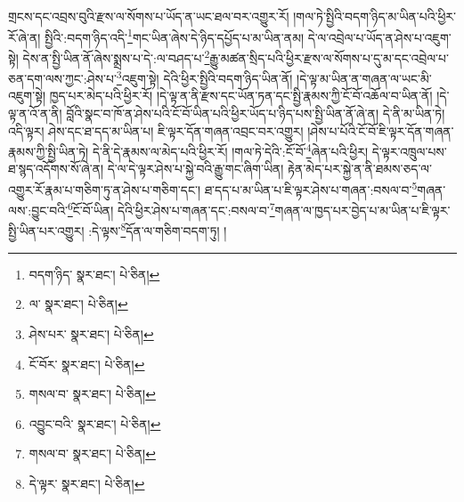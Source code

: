 གྲངས་དང་འབྲས་བུའི་རྫས་ལ་སོགས་པ་ཡོད་ན་ཡང་ཐལ་བར་འགྱུར་རོ། །གལ་ཏེ་སྤྱིའི་བདག་ཉིད་མ་ཡིན་པའི་ཕྱིར་རོ་ཞེ་ན། སྤྱིའི་:བདག་ཉིད་འདི་\footnote{བདག་ཉིད་  སྣར་ཐང་།  པེ་ཅིན། }གང་ཡིན་ཞེས་དེ་ཉིད་དཔྱོད་པ་མ་ཡིན་ནམ། དེ་ལ་འབྲེལ་པ་ཡོད་ན་ཤེས་པ་འཇུག་སྟེ། དེས་ན་སྤྱི་ཡིན་ནོ་ཞེས་སྨྲས་པ་དེ་:ལ་བཤད་པ་\footnote{ལ་  སྣར་ཐང་།  པེ་ཅིན། }རྒྱུ་མཚན་སྲིད་པའི་ཕྱིར་རྫས་ལ་སོགས་པ་དུ་མ་དང་འབྲེལ་པ་ཅན་དག་ལས་ཀྱང་:ཤེས་པ་\footnote{ཤེས་པར་  སྣར་ཐང་།  པེ་ཅིན། }འཇུག་སྟེ། དེའི་ཕྱིར་སྤྱིའི་བདག་ཉིད་ཡིན་ནོ། །དེ་ལྟ་མ་ཡིན་ན་གཞན་ལ་ཡང་མི་འཇུག་སྟེ། ཁྱད་པར་མེད་པའི་ཕྱིར་རོ། །དེ་ལྟ་ན་ནི་རྫས་དང་ཡོན་ཏན་དང་སྤྱི་རྣམས་ཀྱི་ངོ་བོ་འཆོལ་བ་ཡིན་ནོ། །དེ་ལྟ་ན་འོ་ན་ནི། བློའི་སྣང་བ་ཁོ་ན་ཤེས་པའི་ངོ་བོ་ཡིན་པའི་ཕྱིར་ཡོད་པ་ཉིད་པས་སྤྱི་ཡིན་ནོ་ཞེ་ན། དེ་ནི་མ་ཡིན་ཏེ། འདི་ལྟར། ཤེས་དང་ཐ་དད་མ་ཡིན་པ། ཇི་ལྟར་དོན་གཞན་འབྲང་བར་འགྱུར། །ཤེས་པ་པོའི་ངོ་བོ་ཇི་ལྟར་དོན་གཞན་རྣམས་ཀྱི་སྤྱི་ཡིན་ཏེ། དེ་ནི་དེ་རྣམས་ལ་མེད་པའི་ཕྱིར་རོ། །གལ་ཏེ་དེའི་:ངོ་བོ་\footnote{ངོ་བོར་  སྣར་ཐང་།  པེ་ཅིན། }ཞེན་པའི་ཕྱིར། དེ་ལྟར་འཁྲུལ་པས་ཐ་སྙད་འདོགས་སོ་ཞེ་ན། དེ་ལ་དེ་ལྟར་ཤེས་པ་སྐྱེ་བའི་རྒྱུ་གང་ཞིག་ཡིན། རྟེན་མེད་པར་སྐྱེ་ན་ནི་ཐམས་ཅད་ལ་འགྱུར་རོ་རྣམ་པ་གཅིག་ཏུ་ན་ཤེས་པ་གཅིག་དང་། ཐ་དད་པ་མ་ཡིན་པ་ཇི་ལྟར་ཤེས་པ་གཞན་:བསལ་བ་\footnote{གསལ་བ་  སྣར་ཐང་།  པེ་ཅིན། }གཞན་ལས་:བྱུང་བའི་\footnote{འབྱུང་བའི་  སྣར་ཐང་།  པེ་ཅིན། }ངོ་བོ་ཡིན། དེའི་ཕྱིར་ཤེས་པ་གཞན་དང་:བསལ་བ་\footnote{གསལ་བ་  སྣར་ཐང་།  པེ་ཅིན། }གཞན་ལ་ཁྱད་པར་བྱེད་པ་མ་ཡིན་པ་ཇི་ལྟར་སྤྱི་ཡིན་པར་འགྱུར། :དེ་ལྟས་\footnote{དེ་ལྟར་  སྣར་ཐང་།  པེ་ཅིན། }དོན་ལ་གཅིག་བདག་ཏུ། །
